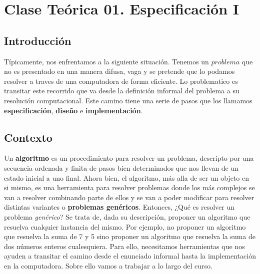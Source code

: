 \documentclass[10pt,a4paper]{article}
\begin{document}
\maketitle

\section{Clase Teórica 01. Especificación I}

\subsection{Introducción}

Típicamente, nos enfrentamos a la siguiente situación. Tenemos un $problema$ que no es presentado en una manera difusa, vaga y se pretende que lo podamos resolver a traves de una computadora de forma eficiente. Lo problematico es transitar este recorrido que va desde la definición informal del problema a su resolución computacional. Este camino tiene una serie de pasos que los llamamos \textbf{especificación}, \textbf{diseño} e \textbf{implementación}. 


\subsection{Contexto}

Un \textbf{algoritmo} es un procedimiento para resolver un problema, descripto por una secuencia ordenada y finita de pasos bien determinados que nos llevan de un estado inicial a uno final.
\newline
\newline
Ahora bien, el algoritmo, más alla de ser un objeto en si mismo, es una herramienta para resolver problemas donde los más complejos se van a resolver combinando parte de ellos y se van a poder modificar para resolver distintas variantes o \textbf{problemas genéricos}.   
\newline
\newline
Entonces, ¿Qué es resolver un problema \textit{genérico}?
\newline
\newline
Se trata de, dada su descripción, proponer un algoritmo que resuelva cualquier instancia del mismo. Por ejemplo, no proponer un algoritmo que resuelva la suma de 7 y 5 sino proponer un algoritmo que resuelva la suma de dos números enteros cualesquiera.  
\newline
\newline
Para ello, necesitamos herramientas que nos ayuden a transitar el camino desde el enunciado informal hasta la implementación en la computadora. Sobre ello vamos a trabajar a lo largo del curso.
\end{document}

